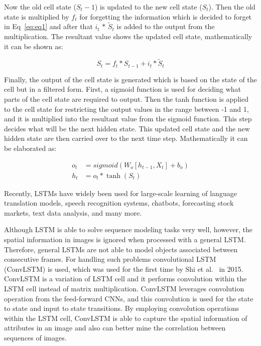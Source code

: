 Now the old cell state ($S_t-1$) is updated to the new cell state ($S_t$).
Then the old state is multiplied by $f_t$ for forgetting the information which is decided to forget in Eq~\ref{eq:eq1} and after that $i_{t}$ $*$ $\tilde{S}_{t}$ is added to the output from the multiplication.
The resultant value shows the updated cell state, mathematically it can be shown as: 

\begin{equation}
S_{t}=f_{t} * S_{t-1}+i_{t} * \tilde{S}_{t}
\label{eq:eq3}
\end{equation}
 
Finally, the output of the cell state is generated which is based on the state of the cell but in a filtered form.
First, a sigmoid function is used for deciding what parts of the cell state are required to output.
Then the tanh function is applied to the cell state for restricting the output values in the range between -1 and 1, and it is multiplied into the resultant value from the sigmoid function.
This step decides what will be the next hidden state. 
This updated cell state and the new hidden state are then carried over to the next time step. Mathematically it can be elaborated as:

\begin{equation}
\begin{aligned}
o_{t} &=sigmoid\left(W_{o}\left[h_{t-1}, X_{t}\right]+b_{o}\right) \\
h_{t} &=o_{t} * \tanh \left(S_{t}\right)
\end{aligned}
\label{eq:eq4}
\end{equation} 

Recently, LSTMs have widely been used for large-scale learning of language translation models, speech recognition systems, chatbots, forecasting stock markets, text data analysis, and many more. 

Although LSTM is able to solve sequence modeling tasks very well, however, the spatial information in images is ignored when processed with a general LSTM.
Therefore, general LSTMs are not able to model objects associated between consecutive frames. 
For handling such problems convolutional LSTM (ConvLSTM) is used, which was used for the first time by Shi et al.~\cite{xingjian2015convolutional} in 2015. 
ConvLSTM is a variation of LSTM cell and it performs convolution within the LSTM cell instead of matrix multiplication.
ConvLSTM leverages convolution operation from the feed-forward CNNs, and this convolution is used for the state to state and input to state transitions.
By employing convolution operations within the LSTM cell, ConvLSTM is able to capture the spatial information of attributes in an image and also can better mine the correlation between sequences of images. 

